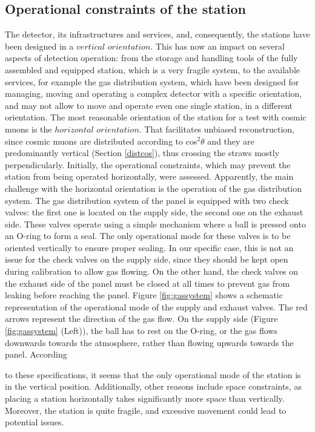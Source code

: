 \subsection{Operational constraints of the station}\label{gassystem}
The detector, its infrastructures 
and services, and, consequently, the stations have been
designed  in a 
$vertical$ $orientation$. This has now an impact 
on several aspects of detection operation: from 
the storage and handling tools of the fully assembled and 
equipped station, which is a very fragile system, to
the available services, for example the gas 
distribution system, which have been designed for
managing, moving and operating a complex 
detector with a specific orientation, and may not
allow to move and operate even one single 
station, in a different orientation. 
The most reasonable orientation of the station for a test with
cosmic muons is the $horizontal$ $orientation$. 
That facilitates unbiased 
reconstruction, since cosmic muons are distributed according to 
cos$^2\theta$ and they are predominantly vertical 
(Section \ref{distcos}), thus crossing the straws mostly perpendicularly.
Initially, the operational constraints, which may prevent the station from being operated horizontally, were assessed.
Apparently, the main challenge with the horizontal orientation is the operation of the gas
distribution system. The gas distribution system of the panel is equipped with two check valves:
the first one is located on the supply side, the second one on the exhaust side. These valves
operate using a simple mechanism where a ball is pressed onto an O-ring to form a seal. The
only operational mode for these valves is to be oriented vertically to ensure proper sealing. In
our specific case, this is not an issue for the check valves on the supply side, since they should
be kept open during calibration to allow gas flowing. On the other hand, the check valves on
the exhaust side of the panel must be closed at all times to prevent gas from leaking before
reaching the panel. Figure \ref{fig:gassystem} shows a schematic 
representation of the operational mode of the supply 
and exhaust valves. The red arrows represent the 
direction of the gas flow. On the supply side (Figure 
\ref{fig:gassystem} (Left)), the ball has to rest on the 
O-ring, or the gas flows downwards towards the atmosphere, 
rather than flowing upwards towards the panel. According

to these specifications, it seems that the only operational 
mode of the station is in the vertical position. 
Additionally, other reasons include space constraints, as placing 
a station horizontally takes significantly more space than 
vertically. Moreover, the station is quite fragile, and 
excessive movement could lead to potential issues.

